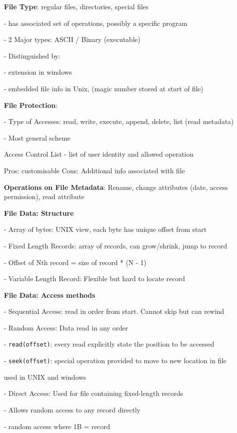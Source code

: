 \documentclass[10pt, a4paper]{article}
\newcommand{\blue}[1]{{\color{MidnightBlue}#1}}
\newcommand{\red}[1]{{\color{red}#1}}
\newcommand{\green}[1]{{\color{ForestGreen}#1}}
\newcommand{\tab}[0]{\hspace*{2mm}}
\begin{document}
\begin{multicols*}{3}
		\textbf{File Type}: regular files, directories, special files
		
		- has associated set of operations, possibly a specific program

		- 2 Major types: ASCII / Binary (executable)

		- Distinguished by:

		\tab{} - extension in windows

		\tab{} - embedded file info in Unix, (magic number stored at start of file)

		\textbf{File Protection}:

		- Type of Accesses: read, write, execute, append, delete, list (read metadata)

		- Most general scheme
		
		\tab{} \blue{Access Control List} - list of user identity and allowed operation

		\tab{} \green{Pros}: customisable \red{Cons}: Additional info associated with file

		\textbf{Operations on File Metadata}: Rename, change attributes (date, access permission), read attribute

		\textbf{File Data: Structure}

		- Array of bytes: UNIX view, each byte has unique offset from start

		- Fixed Length Records: array of records, can grow/shrink, jump to record

		\tab{} - Offset of Nth record = size of record * (N - 1)

		- Variable Length Record: Flexible but hard to locate record

		\textbf{File Data: Access methods}

		- Sequential Access: read in order from start. Cannot skip but can rewind

		- Random Access: Data read in any order 

		\tab{} - \texttt{read(offset)}: every read explicitly state the position to be accessed

		\tab{} - \texttt{seek(offset)}: special operation provided to move to new location in file

		\tab{} used in UNIX and windows

		- Direct Access: Used for file containing fixed-length records

		\tab{} - Allows random access to any record directly 

		\tab{} - random access where 1B = record


\end{multicols*}
\end{document}

